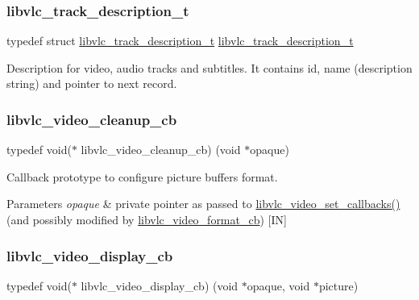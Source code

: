 \subsubsection{\texorpdfstring{libvlc\+\_\+track\+\_\+description\+\_\+t}{libvlc\_track\_description\_t}}
{\footnotesize\ttfamily typedef struct \hyperlink{structlibvlc__track__description__t}{libvlc\+\_\+track\+\_\+description\+\_\+t}  \hyperlink{structlibvlc__track__description__t}{libvlc\+\_\+track\+\_\+description\+\_\+t}}

Description for video, audio tracks and subtitles. It contains id, name (description string) and pointer to next record. \mbox{\label{group__libvlc__media__player_ga47f87563b82ed4b6d70ef51243003ae9}} 
\subsubsection{\texorpdfstring{libvlc\+\_\+video\+\_\+cleanup\+\_\+cb}{libvlc\_video\_cleanup\_cb}}
{\footnotesize\ttfamily typedef void($\ast$ libvlc\+\_\+video\+\_\+cleanup\+\_\+cb) (void $\ast$opaque)}

Callback prototype to configure picture buffers format.


\begin{DoxyParams}{Parameters}
{\em opaque} & private pointer as passed to \hyperlink{group__libvlc__media__player_ga612605f2e5c638d9f4ed59021d714bf0}{libvlc\+\_\+video\+\_\+set\+\_\+callbacks()} (and possibly modified by \hyperlink{group__libvlc__media__player_gae46128c21d0d0151aca3ba017d1d6b35}{libvlc\+\_\+video\+\_\+format\+\_\+cb}) \mbox{[}IN\mbox{]} \\
\hline
\end{DoxyParams}
\mbox{\label{group__libvlc__media__player_ga2189c9deefc2154ddc5d5f1871b0a106}} 
\subsubsection{\texorpdfstring{libvlc\+\_\+video\+\_\+display\+\_\+cb}{libvlc\_video\_display\_cb}}
{\footnotesize\ttfamily typedef void($\ast$ libvlc\+\_\+video\+\_\+display\+\_\+cb) (void $\ast$opaque, void $\ast$picture)}

